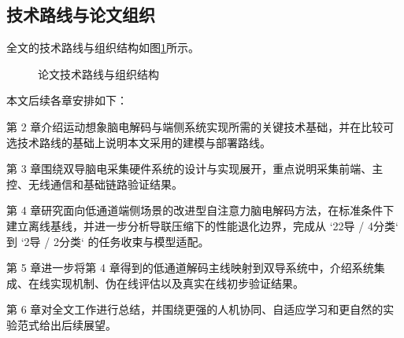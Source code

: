 \subsection{技术路线与论文组织}

全文的技术路线与组织结构如图\ref{fig:org}所示。
\begin{figure}[htbp]
  \centering
  \caption{论文技术路线与组织结构}
  \label{fig:org}
\end{figure}

本文后续各章安排如下：

第 2 章介绍运动想象脑电解码与端侧系统实现所需的关键技术基础，并在比较可选技术路线的基础上说明本文采用的建模与部署路线。

第 3 章围绕双导脑电采集硬件系统的设计与实现展开，重点说明采集前端、主控、无线通信和基础链路验证结果。

第 4 章研究面向低通道端侧场景的改进型自注意力脑电解码方法，在标准条件下建立离线基线，并进一步分析导联压缩下的性能退化边界，完成从 `22导 / 4分类` 到 `2导 / 2分类` 的任务收束与模型适配。

第 5 章进一步将第 4 章得到的低通道解码主线映射到双导系统中，介绍系统集成、在线实现机制、伪在线评估以及真实在线初步验证结果。

第 6 章对全文工作进行总结，并围绕更强的人机协同、自适应学习和更自然的实验范式给出后续展望。
